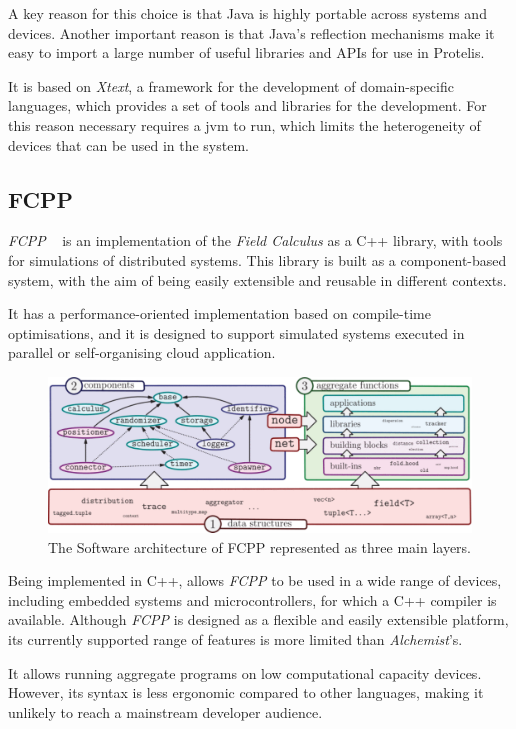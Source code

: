A key reason for this choice is that Java is highly portable across systems and devices.
Another important reason is that Java's reflection mechanisms make it easy to import a large number of useful libraries
and APIs for use in Protelis.

It is based on \emph{Xtext}, a framework for the development of domain-specific languages, which provides a set of tools
and libraries for the development.
For this reason necessary requires a \ac{jvm} to run, which limits the heterogeneity of devices
that can be used in the system.

\subsection{FCPP}
\label{subsec:fcpp}
\emph{FCPP} ~\cite{9196401} is an implementation of the \emph{Field Calculus} as a C++ library, with tools for simulations of distributed systems.
This library is built as a component-based system, with the aim of being easily extensible and reusable in different contexts.

It has a performance-oriented implementation based on compile-time optimisations, and it is designed to support
simulated systems executed in parallel or self-organising cloud application.

\begin{figure}
    \centering
    \includegraphics[width=.8\linewidth]{figures/fcpp-structure}
    \caption{The Software architecture of FCPP represented as three main layers.}
    \label{fig:fcpp-structure}
\end{figure}

Being implemented in C++, allows \emph{FCPP} to be used in a wide range of devices, including embedded systems and
microcontrollers, for which a C++ compiler is available.
Although \emph{FCPP} is designed as a flexible and easily extensible platform, its currently supported range of features
is more limited than \emph{Alchemist}'s.

It allows running aggregate programs on low computational capacity devices.
However, its syntax is less ergonomic compared to other languages, making it unlikely to reach a mainstream developer audience.

